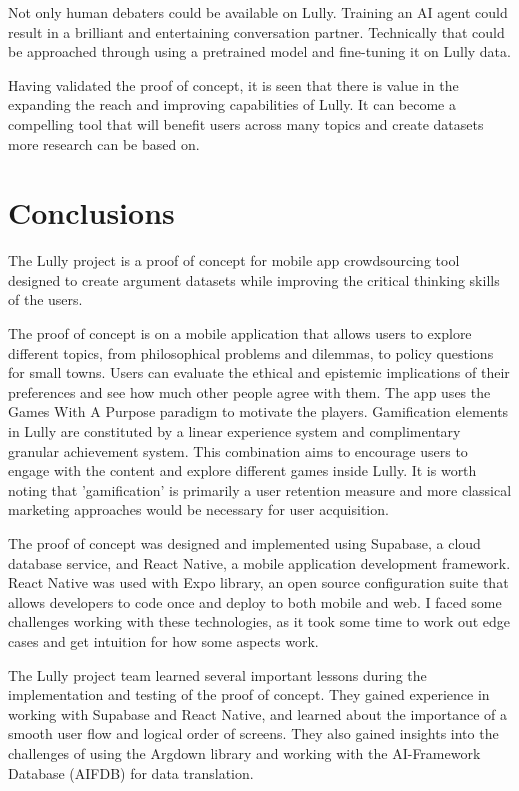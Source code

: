 \documentclass{article}
\begin{document}
Not only human debaters could be available on Lully. Training an AI agent could result in a brilliant and entertaining conversation partner. Technically that could be approached through using a pretrained model and fine-tuning it on Lully data.

Having validated the proof of concept, it is seen that there is value in the expanding the reach and improving capabilities of Lully. It can become a compelling tool that will benefit users across many topics and create datasets more research can be based on.

\newpage

\chapter{Conclusions}

The Lully project is a proof of concept for mobile app crowdsourcing tool designed to create argument datasets while improving the critical thinking skills of the users. 

The proof of concept is on a mobile application that allows users to explore different topics, from philosophical problems and dilemmas, to policy questions for small towns. Users can evaluate the ethical and epistemic implications of their preferences and see how much other people agree with them. The app uses the Games With A Purpose paradigm to motivate the players. Gamification elements in Lully are constituted by a linear experience system and complimentary granular achievement system. This combination aims to encourage users to engage with the content and explore different games inside Lully. It is worth noting that 'gamification' is primarily a user retention measure and more classical marketing approaches would be necessary for user acquisition.

The proof of concept was designed and implemented using Supabase, a cloud database service, and React Native, a mobile application development framework. React Native was used with Expo library, an open source configuration suite that allows developers to code once and deploy to both mobile and web. I faced some challenges working with these technologies, as it took some time to work out edge cases and get intuition for how some aspects work.


The Lully project team learned several important lessons during the implementation and testing of the proof of concept. They gained experience in working with Supabase and React Native, and learned about the importance of a smooth user flow and logical order of screens. They also gained insights into the challenges of using the Argdown library and working with the AI-Framework Database (AIFDB) for data translation.
\end{document}
